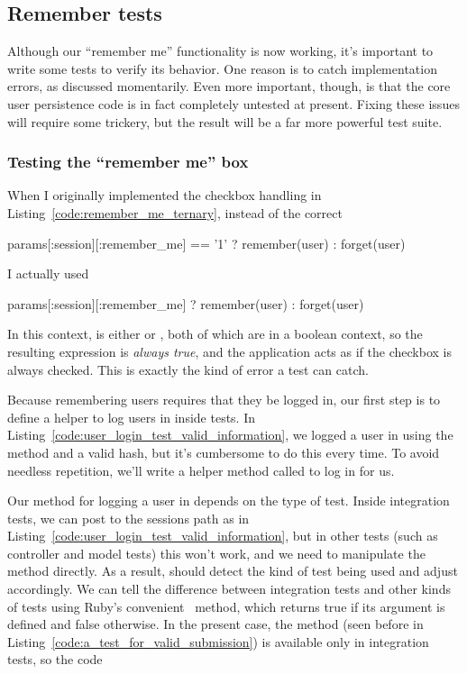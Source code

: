 \subsection{Remember tests} %
\label{sec:remember_tests}

Although our ``remember me'' functionality is now working, it's important to write some tests to verify its behavior. One reason is to catch implementation errors, as discussed momentarily. Even more important, though, is that the core user persistence code is in fact completely untested at present. Fixing these issues will require some trickery, but the result will be a far more powerful test suite.

\subsubsection{Testing the ``remember me'' box} %
\label{sec:testing_the_remember_me_box}

When I originally implemented the checkbox handling in Listing~\ref{code:remember_me_ternary}, instead of the correct

\begin{code}
params[:session][:remember_me] == '1' ? remember(user) : forget(user)
\end{code}

\noindent I actually used

\begin{code}
params[:session][:remember_me] ? remember(user) : forget(user)
\end{code}

\noindent In this context,  is either  or , both of which are  in a boolean context, so the resulting expression is \emph{always true}, and the application acts as if the checkbox is always checked. This is exactly the kind of error a test can catch.

Because remembering users requires that they be logged in, our first step is to define a helper to log users in inside tests. In Listing~\ref{code:user_login_test_valid_information}, we logged a user in using the  method and a valid  hash, but it's cumbersome to do this every time. To avoid needless repetition, we'll write a helper method called  to log in for us.

Our method for logging a user in depends on the type of test. Inside integration tests, we can post to the sessions path as in Listing~\ref{code:user_login_test_valid_information}, but in other tests (such as controller and model tests) this won't work, and we need to manipulate the  method directly. As a result,  should detect the kind of test being used and adjust accordingly. We can tell the difference between integration tests and other kinds of tests using Ruby's convenient \ method, which returns true if its argument is defined and false otherwise. In the present case, the  method (seen before in Listing~\ref{code:a_test_for_valid_submission}) is available only in integration tests, so the code

